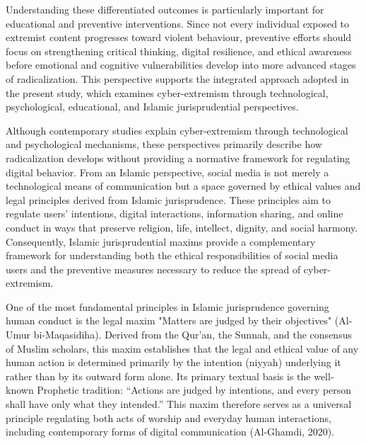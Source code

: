 \documentclass{NSP1}
\begin{document}
Understanding these differentiated outcomes is particularly important for educational and preventive interventions. Since not every individual exposed to extremist content progresses toward violent behaviour, preventive efforts should focus on strengthening critical thinking, digital resilience, and ethical awareness before emotional and cognitive vulnerabilities develop into more advanced stages of radicalization. This perspective supports the integrated approach adopted in the present study, which examines cyber-extremism through technological, psychological, educational, and Islamic jurisprudential perspectives.

\par\medskip{}\smallskip

Although contemporary studies explain cyber-extremism through technological and psychological mechanisms, these perspectives primarily describe how radicalization develops without providing a normative framework for regulating digital behavior. From an Islamic perspective, social media is not merely a technological means of communication but a space governed by ethical values and legal principles derived from Islamic jurisprudence. These principles aim to regulate users' intentions, digital interactions, information sharing, and online conduct in ways that preserve religion, life, intellect, dignity, and social harmony. Consequently, Islamic jurisprudential maxims provide a complementary framework for understanding both the ethical responsibilities of social media users and the preventive measures necessary to reduce the spread of cyber-extremism.

\par\medskip{}\smallskip

One of the most fundamental principles in Islamic jurisprudence governing human conduct is the legal maxim "Matters are judged by their objectives" (Al-Umur bi-Maqasidiha). Derived from the Qur'an, the Sunnah, and the consensus of Muslim scholars, this maxim establishes that the legal and ethical value of any human action is determined primarily by the intention (niyyah) underlying it rather than by its outward form alone. Its primary textual basis is the well-known Prophetic tradition: “Actions are judged by intentions, and every person shall have only what they intended.” This maxim therefore serves as a universal principle regulating both acts of worship and everyday human interactions, including contemporary forms of digital communication (Al-Ghamdi, 2020).
\end{document}

